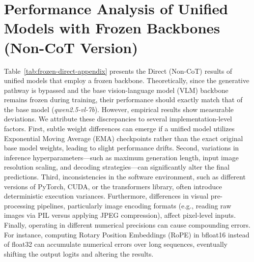 \documentclass{article}
\theoremstyle{plain}
\theoremstyle{definition}
\theoremstyle{remark}
\begin{document}
\section{Performance Analysis of Unified Models with Frozen Backbones (Non-CoT Version)}
\label{Frozen_Backbones}
\begin{table}[ht]
\centering
\caption{\textbf{Direct (Non-CoT) results of frozen-backbone models on UniG2U.} All values are reported as percentages ($\times 100$). The Overall column represents the average accuracy across all task categories.}
\label{tab:frozen-direct-appendix}
\end{table}

Table~\ref{tab:frozen-direct-appendix} presents the Direct (Non-CoT) results of unified models that employ a frozen backbone. Theoretically, since the generative pathway is bypassed and the base vision-language model (VLM) backbone remains frozen during training, their performance should exactly match that of the base model (\textit{qwen2.5-vl-7b}). However, empirical results show measurable deviations. We attribute these discrepancies to several implementation-level factors. First, subtle weight differences can emerge if a unified model utilizes Exponential Moving Average (EMA) checkpoints rather than the exact original base model weights, leading to slight performance drifts. Second, variations in inference hyperparameters—such as maximum generation length, input image resolution scaling, and decoding strategies—can significantly alter the final predictions. Third, inconsistencies in the software environment, such as different versions of PyTorch, CUDA, or the transformers library, often introduce deterministic execution variances. Furthermore, differences in visual pre-processing pipelines, particularly image encoding formats (e.g., reading raw images via PIL versus applying JPEG compression), affect pixel-level inputs. Finally, operating in different numerical precisions can cause compounding errors. For instance, computing Rotary Position Embeddings (RoPE) in bfloat16 instead of float32 can accumulate numerical errors over long sequences, eventually shifting the output logits and altering the results.
\end{document}
